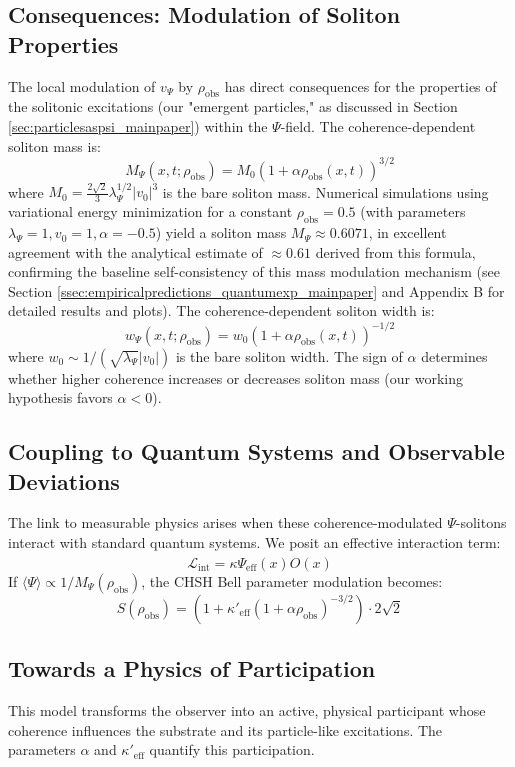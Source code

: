 \documentclass[11pt, a4paper]{book}
\begin{document}
\subsection{Consequences: Modulation of Soliton Properties}
\label{ssec:coherencemodulation_consequences_actual}
The local modulation of $v_\Psi$ by $\rho_{\text{obs}}$ has direct consequences for the properties of the solitonic excitations (our "emergent particles," as discussed in Section \ref{sec:particlesaspsi_mainpaper}) within the $\Psi$-field. The coherence-dependent soliton mass is:
\[ M_\Psi(x,t; \rho_{\text{obs}}) = M_0 \left(1 + \alpha \rho_{\text{obs}}(x,t)\right)^{3/2} \]
where $M_0 = \frac{2\sqrt{2}}{3} \lambda_\Psi^{1/2} |v_0|^3$ is the bare soliton mass. Numerical simulations using variational energy minimization for a constant $\rho_{\text{obs}} = 0.5$ (with parameters $\lambda_\Psi=1, v_0=1, \alpha=-0.5$) yield a soliton mass $M_\Psi \approx 0.6071$, in excellent agreement with the analytical estimate of $\approx 0.61$ derived from this formula, confirming the baseline self-consistency of this mass modulation mechanism (see Section \ref{ssec:empiricalpredictions_quantumexp_mainpaper} and Appendix B for detailed results and plots). The coherence-dependent soliton width is:
\[ w_\Psi(x,t; \rho_{\text{obs}}) = w_0 \left(1 + \alpha \rho_{\text{obs}}(x,t)\right)^{-1/2} \]
where $w_0 \sim 1/(\sqrt{\lambda_\Psi} |v_0|)$ is the bare soliton width. The sign of $\alpha$ determines whether higher coherence increases or decreases soliton mass (our working hypothesis favors $\alpha < 0$).

\subsection{Coupling to Quantum Systems and Observable Deviations}
\label{ssec:coherencemodulation_coupling_actual}
The link to measurable physics arises when these coherence-modulated $\Psi$-solitons interact with standard quantum systems. We posit an effective interaction term:
\[ \mathcal{L}_{\text{int}} = \kappa \Psi_{\text{eff}}(x) \hat{O}(x) \]
If $\langle\Psi\rangle \propto 1/M_\Psi(\rho_{\text{obs}})$, the CHSH Bell parameter modulation becomes:
\[ S(\rho_{\text{obs}}) = \left(1 + \kappa'_{\text{eff}} (1 + \alpha \rho_{\text{obs}})^{-3/2}\right) \cdot 2\sqrt{2} \]

\subsection{Towards a Physics of Participation}
\label{ssec:coherencemodulation_participation_actual}
This model transforms the observer into an active, physical participant whose coherence influences the substrate and its particle-like excitations. The parameters $\alpha$ and $\kappa'_{\text{eff}}$ quantify this participation.
\end{document}
